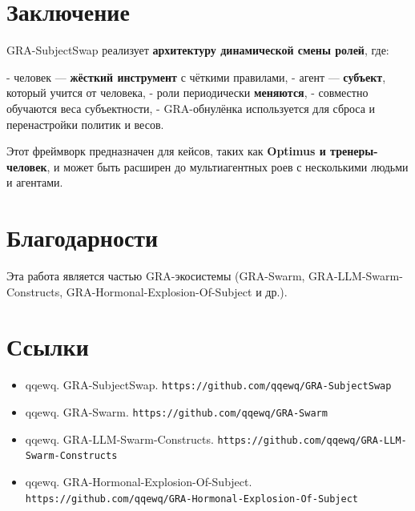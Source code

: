 \documentclass[11pt,a4paper]{article}
\begin{document}
\section{Заключение}

GRA-SubjectSwap реализует \textbf{архитектуру динамической смены ролей}, где:

- человек — \textbf{жёсткий инструмент} с чёткими правилами,
- агент — \textbf{субъект}, который учится от человека,
- роли периодически \textbf{меняются},
- совместно обучаются веса субъектности,
- GRA-обнулёнка используется для сброса и перенастройки политик и весов.

Этот фреймворк предназначен для кейсов, таких как \textbf{Optimus и тренеры-человек}, и может быть расширен до мультиагентных роев с несколькими людьми и агентами.

\section*{Благодарности}

Эта работа является частью GRA-экосистемы (GRA-Swarm, GRA-LLM-Swarm-Constructs, GRA-Hormonal-Explosion-Of-Subject и др.).

\section*{Ссылки}

\begin{itemize}
\item qqewq. GRA-SubjectSwap. \texttt{https://github.com/qqewq/GRA-SubjectSwap}
\item qqewq. GRA-Swarm. \texttt{https://github.com/qqewq/GRA-Swarm}
\item qqewq. GRA-LLM-Swarm-Constructs. \texttt{https://github.com/qqewq/GRA-LLM-Swarm-Constructs}
\item qqewq. GRA-Hormonal-Explosion-Of-Subject. \texttt{https://github.com/qqewq/GRA-Hormonal-Explosion-Of-Subject}
\end{itemize}
\end{document}
